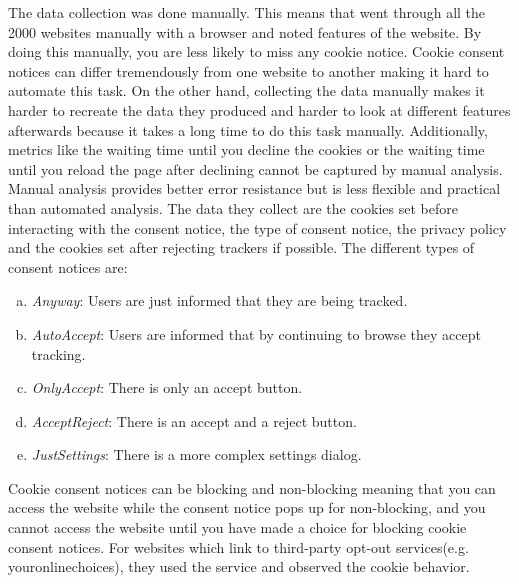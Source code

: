 The data collection was done manually. This means that \citeauthor{sanchez2019can} went through all the 2000 websites
manually with a browser and noted features of the website. By doing this manually, you are less likely to miss any cookie notice.
Cookie consent notices can differ tremendously from one website to another making it hard to
automate this task. On the other hand, collecting the data manually makes it harder to recreate the data they produced
and harder to look at different features afterwards because it takes a long time to do this task manually.
Additionally, metrics like the waiting time until you decline the cookies or the waiting time until you reload
the page after declining cannot be captured by manual analysis. Manual analysis provides better error resistance but is
less flexible and practical than automated analysis. The data they collect are the cookies set before interacting with the
consent notice, the type of consent notice, the privacy policy and the cookies set after rejecting trackers if possible.
The different types of consent notices are:
\begin{enumerate}[a)]
    \item \emph{Anyway}: Users are just informed that they are being tracked.
    \item \emph{AutoAccept}: Users are informed that by continuing to browse they accept tracking.
    \item \emph{OnlyAccept}: There is only an accept button.
    \item \emph{AcceptReject}: There is an accept and a reject button.
    \item \emph{JustSettings}: There is a more complex settings dialog.
\end{enumerate}
Cookie consent notices can be blocking and non-blocking meaning that you can access the website while the consent notice pops up for
non-blocking, and you cannot access the website until you have made a choice for blocking cookie consent notices. For
websites which link to third-party opt-out services(e.g. youronlinechoices), they used the service and observed the
cookie behavior.

